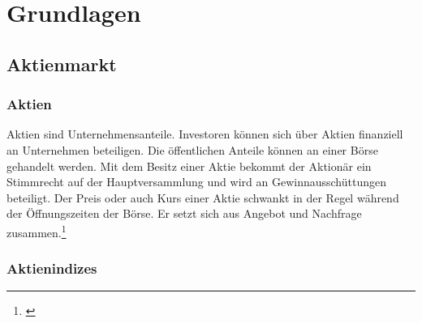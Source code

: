 \section{Grundlagen}

\subsection{Aktienmarkt}

\subsubsection{Aktien}


Aktien sind Unternehmensanteile. Investoren können sich über Aktien finanziell an Unternehmen beteiligen. Die öffentlichen Anteile können an einer Börse gehandelt werden. Mit dem Besitz einer Aktie bekommt der Aktionär ein Stimmrecht auf der Hauptversammlung und wird an Gewinnausschüttungen beteiligt. Der Preis oder auch Kurs einer Aktie schwankt in der Regel während der Öffnungszeiten der Börse. Er setzt sich aus Angebot und Nachfrage zusammen.\footnote{\cite[Vgl.][35]{Chan2019}}


\subsubsection{Aktienindizes}



